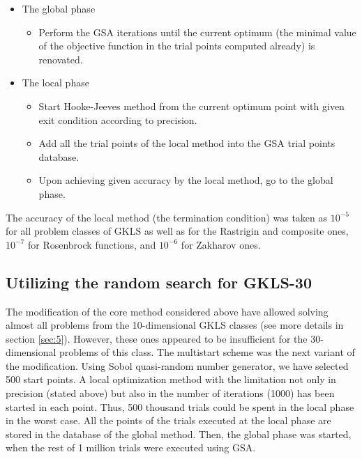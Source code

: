 \documentclass{llncs}
\begin{document}
\begin{itemize}
	\item The global phase
	
	\begin{itemize}
		\item Perform the GSA iterations until the current optimum (the minimal value of the objective function in the trial points computed already) is renovated.
	\end{itemize}
	
	\item The local phase
		\begin{itemize}
		\item Start Hooke-Jeeves method from the current optimum point with given exit condition according to precision.
		\item Add all the trial points of the local method into the GSA trial points database.
		\item Upon achieving given accuracy by the local method, go to the global phase.
	\end{itemize}

\end{itemize}


The accuracy of the local method (the termination condition) was taken as $10^{-5}$ for all problem classes of GKLS as well as for the Rastrigin and composite ones,  $10^{-7}$ for Rosenbrock functions, and $10^{-6}$ for Zakharov ones.

\subsection{Utilizing the random search for GKLS-30}\label{random}

The modification of the core method considered above have allowed solving almost all problems from the 10-dimensional GKLS classes (see more details in section \ref{sec:5}). However, these ones appeared to be insufficient for the 30-dimensional problems of this class. 
The multistart scheme was the next variant of the modification. Using Sobol quasi-random number generator, we have selected 500 start points. A local optimization method with the limitation not only in precision (stated above) but also in the number of iterations (1000) has been started in each point. Thus, 500 thousand trials could be spent in the local phase in the worst case. All the points of the trials executed at the local phase are stored in the database of the global method. Then, the global phase was started, when the rest of 1 million trials were executed using GSA.
\end{document}

